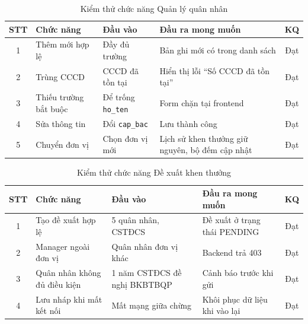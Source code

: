\documentclass[../DoAn.tex]{subfiles}
\begin{document}
\begin{table}[H]
\centering
\caption{Kiểm thử chức năng Quản lý quân nhân}
\label{tab:kt-quannhan}
\begin{tabular}{|c|p{4cm}|p{3.5cm}|p{4cm}|c|}
\hline
\textbf{STT} & \textbf{Chức năng} & \textbf{Đầu vào} & \textbf{Đầu ra mong muốn} & \textbf{KQ} \\ \hline
1 & Thêm mới hợp lệ & Đầy đủ trường & Bản ghi mới có trong danh sách & Đạt \\ \hline
2 & Trùng CCCD & CCCD đã tồn tại & Hiển thị lỗi ``Số CCCD đã tồn tại'' & Đạt \\ \hline
3 & Thiếu trường bắt buộc & Để trống \texttt{ho\_ten} & Form chặn tại frontend & Đạt \\ \hline
4 & Sửa thông tin & Đổi \texttt{cap\_bac} & Lưu thành công & Đạt \\ \hline
5 & Chuyển đơn vị & Chọn đơn vị mới & Lịch sử khen thưởng giữ nguyên, bộ đếm cập nhật & Đạt \\ \hline
\end{tabular}
\end{table}

\begin{table}[H]
\centering
\caption{Kiểm thử chức năng Đề xuất khen thưởng}
\label{tab:kt-dexuat}
\begin{tabular}{|c|p{4cm}|p{3.5cm}|p{4cm}|c|}
\hline
\textbf{STT} & \textbf{Chức năng} & \textbf{Đầu vào} & \textbf{Đầu ra mong muốn} & \textbf{KQ} \\ \hline
1 & Tạo đề xuất hợp lệ & 5 quân nhân, CSTĐCS & Đề xuất ở trạng thái PENDING & Đạt \\ \hline
2 & Manager ngoài đơn vị & Quân nhân đơn vị khác & Backend trả 403 & Đạt \\ \hline
3 & Quân nhân không đủ điều kiện & 1 năm CSTĐCS đề nghị BKBTBQP & Cảnh báo trước khi gửi & Đạt \\ \hline
4 & Lưu nháp khi mất kết nối & Mất mạng giữa chừng & Khôi phục dữ liệu khi vào lại & Đạt \\ \hline
\end{tabular}
\end{table}
\end{document}
